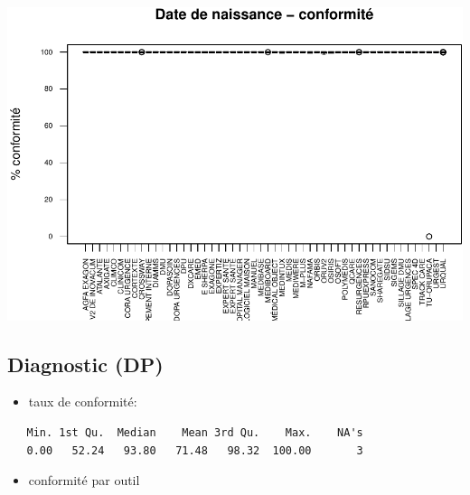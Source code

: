 \documentclass[]{article}
\begin{document}
\includegraphics{septembre2015_files/figure-latex/unnamed-chunk-15-1.pdf}

\subsection{Diagnostic (DP)}\label{diagnostic-dp}

\begin{itemize}
\itemsep1pt\parskip0pt
\item
  taux de conformité:
\end{itemize}

\begin{verbatim}
   Min. 1st Qu.  Median    Mean 3rd Qu.    Max.    NA's 
   0.00   52.24   93.80   71.48   98.32  100.00       3 
\end{verbatim}

\begin{itemize}
\itemsep1pt\parskip0pt
\item
  conformité par outil
\end{itemize}
\end{document}
